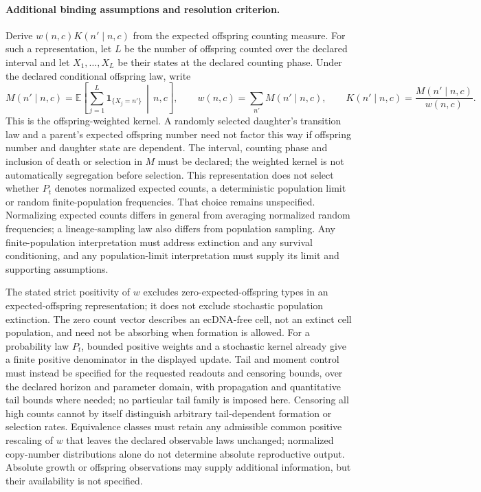 \documentclass[11pt]{article}
\begin{document}
\paragraph{Additional binding assumptions and resolution criterion.} Derive $w(n,c)K(n'\mid n,c)$ from the expected offspring counting measure. For such a representation, let $L$ be the number of offspring counted over the declared interval and let $X_1,\ldots,X_L$ be their states at the declared counting phase. Under the declared conditional offspring law, write
\[
M(n'\mid n,c)=\mathbb{E}\!\left[\sum_{j=1}^{L}\mathbf{1}_{\{X_j=n'\}}\,\middle|\,n,c\right],\qquad
w(n,c)=\sum_{n'}M(n'\mid n,c),\qquad
K(n'\mid n,c)=\frac{M(n'\mid n,c)}{w(n,c)}.
\]
This is the offspring-weighted kernel. A randomly selected daughter's transition law and a parent's expected offspring number need not factor this way if offspring number and daughter state are dependent. The interval, counting phase and inclusion of death or selection in $M$ must be declared; the weighted kernel is not automatically segregation before selection. This representation does not select whether $P_t$ denotes normalized expected counts, a deterministic population limit or random finite-population frequencies. That choice remains unspecified. Normalizing expected counts differs in general from averaging normalized random frequencies; a lineage-sampling law also differs from population sampling. Any finite-population interpretation must address extinction and any survival conditioning, and any population-limit interpretation must supply its limit and supporting assumptions.

The stated strict positivity of $w$ excludes zero-expected-offspring types in an expected-offspring representation; it does not exclude stochastic population extinction. The zero count vector describes an ecDNA-free cell, not an extinct cell population, and need not be absorbing when formation is allowed. For a probability law $P_t$, bounded positive weights and a stochastic kernel already give a finite positive denominator in the displayed update. Tail and moment control must instead be specified for the requested readouts and censoring bounds, over the declared horizon and parameter domain, with propagation and quantitative tail bounds where needed; no particular tail family is imposed here. Censoring all high counts cannot by itself distinguish arbitrary tail-dependent formation or selection rates. Equivalence classes must retain any admissible common positive rescaling of $w$ that leaves the declared observable laws unchanged; normalized copy-number distributions alone do not determine absolute reproductive output. Absolute growth or offspring observations may supply additional information, but their availability is not specified.
\end{document}
